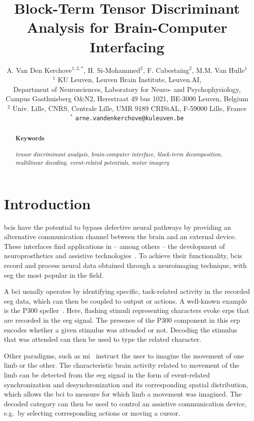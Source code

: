 \documentclass[twocolumn]{article}
\title{Block-Term Tensor Discriminant Analysis for Brain-Computer Interfacing}
\author{%
	A. Van Den Kerchove$^{1,2,*}$,
	H. Si-Mohammed$^{2}$,
	F. Cabestaing$^{2}$,
	M.M. Van Hulle$^{1}$
	\bigskip\\
	$^1$ KU Leuven,
	Leuven Brain Institute,
	Leuven.AI,\\
	Department of Neurosciences,
	Laboratory for Neuro- and Psychophysiology,
	\\
	Campus Gasthuisberg O\&N2,
	Herestraat 49 bus 1021,
	BE-3000 Leuven,
	Belgium
	\smallskip\\
	$^2$ Univ. Lille, CNRS, Centrale Lille,
	UMR 9189 CRIStAL,
	F-59000 Lille,
	France
	\smallskip\\
	$^*$ \texttt{arne.vandenkerchove@kuleuven.be}
}
\begin{document}
\maketitle

\begin{abstract}
	

	\paragraph{Keywords}
	\emph{%
		tensor discriminant analysis,
		brain-computer interface,
		block-term decomposition,
		multilinear decoding,
		event-related potentials,
		motor imagery
	}
\end{abstract}

\section{Introduction}

\Acp{bci} have the potential to bypass
defective neural pathways by providing an alternative communication channel
between the brain and an external device.
These interfaces find applications in -- among others -- the development of
neuroprosthetics and assistive technologies~\cite{Wolpaw2020}.
To achieve their functionality, \acp{bci} record and process neural data obtained through
a neuroimaging technique,  with \ac{eeg} the most popular in the field.

A \ac{bci} usually operates by identifying specific, task-related activity in
the recorded \ac{eeg} data, which can then be coupled to output or actions.
A well-known example is the P300 speller~\cite{Krusienski2006}.
Here, flashing stimuli representing characters evoke \acp{erp} that are recorded in the
\ac{eeg} signal.
The presence of the P300 component in this \ac{erp} encodes whether a given
stimulus was attended or not.
Decoding the stimulus that was attended can then be used to type the related
character.

Other paradigms, such as \ac{mi}~\cite{Aggarwal2019} instruct the user to imagine the movement of
one limb or the other.
The characteristic brain activity related to movement of the limb can be
detected from the \ac{eeg} signal in the form of event-related synchronization
and desynchronization and its corresponding spatial distribution,
which allows the \ac{bci} to measure for which limb a movement was
imagined.
The decoded category can then be used to control an assistive communication
device,
e.g.\ by selecting corresponding actions or moving a cursor.
\end{document}
